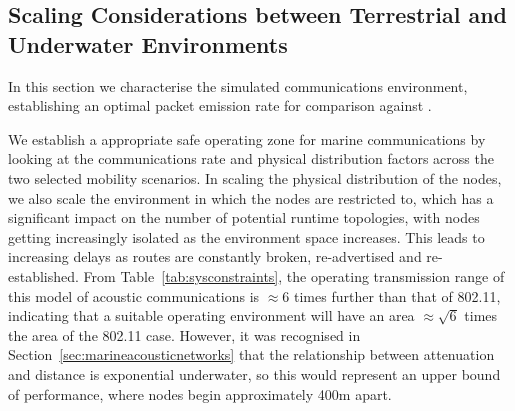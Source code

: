 \documentclass[conference]{IEEEtran}
\begin{document}
\subsection{Scaling Considerations between Terrestrial and Underwater Environments}

In this section we characterise the simulated communications environment, establishing an optimal packet emission rate for comparison against \cite{Guo11}.

We establish a appropriate safe operating zone for marine communications by looking at the communications rate and physical distribution factors across the two selected mobility scenarios.
In scaling the physical distribution of the nodes, we also scale the environment in which the nodes are restricted to, which has a significant impact on the number of potential runtime topologies, with nodes getting increasingly isolated as the environment space increases.
This leads to increasing delays as routes are constantly broken, re-advertised and re-established. 
From Table~\ref{tab:sysconstraints}, the operating transmission range of this model of acoustic communications is $\approx 6$ times further than that of 802.11, indicating that a suitable operating environment will have an area $\approx \sqrt{6}$ times the area of the 802.11 case.
However, it was recognised in Section~\ref{sec:marineacousticnetworks} that the relationship between attenuation and distance is exponential underwater, so this would represent an upper bound of performance, where nodes begin approximately 400m apart. 
\end{document}
